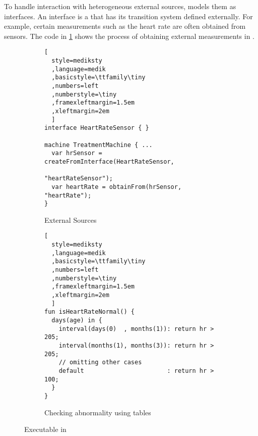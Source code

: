 To handle interaction with heterogeneous external sources, \MediK{}
models them as interfaces. An interface is a \FSM{} that has its
transition system defined externally. For example, certain measurements
such as the heart rate are often obtained from sensors.
The code in \figurename{} \ref{fig:interface} shows the process
of obtaining external measurements in \MediK{}.

\begin{figure}[b]
  \begin{subfigure}[b]{0.5\textwidth}
\begin{lstlisting}[
  style=mediksty
  ,language=medik
  ,basicstyle=\ttfamily\tiny
  ,numbers=left
  ,numberstyle=\tiny
  ,framexleftmargin=1.5em
  ,xleftmargin=2em
  ]
interface HeartRateSensor { }

machine TreatmentMachine { ...
  var hrSensor = createFromInterface(HeartRateSensor,
                              "heartRateSensor");
  var heartRate = obtainFrom(hrSensor, "heartRate");
}
\end{lstlisting}\caption{External Sources}\label{fig:interface}
  \end{subfigure}
  \begin{subfigure}[b]{0.47\textwidth}
\begin{lstlisting}[
  style=mediksty
  ,language=medik
  ,basicstyle=\ttfamily\tiny
  ,numbers=left
  ,numberstyle=\tiny
  ,framexleftmargin=1.5em
  ,xleftmargin=2em
  ]
fun isHeartRateNormal() {
  days(age) in {
    interval(days(0)  , months(1)): return hr > 205;
    interval(months(1), months(3)): return hr > 205;
    // omitting other cases
    default                       : return hr > 100;
  }
}
\end{lstlisting}
  \caption{Checking abnormality using tables}\label{fig:hr-check-fun}
  \end{subfigure}
  \caption{Executable \BPGs{} in \MediK{}}
\end{figure}


